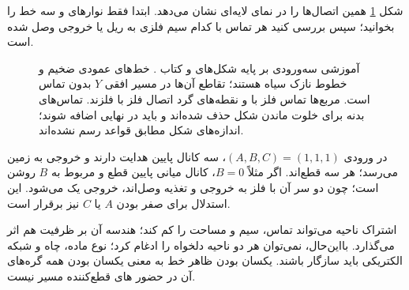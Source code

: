 شکل \ref{fig:layout-nand-stick} همین اتصال‌ها را در نمای لایه‌ای نشان می‌دهد.
ابتدا فقط نوارهای  و سه خط  را بخوانید؛
سپس بررسی کنید هر تماس با کدام سیم فلزی به ریل یا خروجی وصل شده است.
\begin{figure}[ht]
\centering
\begin{latin}
\end{latin}
\caption{ آموزشی  سه‌ورودی بر پایه شکل‌های
 و  کتاب \cite{weste}.
خط‌های عمودی ضخیم  و خطوط نازک سیاه  هستند؛
تقاطع آن‌ها در مسیر افقی \(Y\) بدون تماس است.
مربع‌ها تماس فلز با  و نقطه‌های گرد اتصال فلز با فلزند.
تماس‌های بدنه برای خلوت ماندن شکل حذف شده‌اند و باید در  نهایی اضافه شوند؛
اندازه‌های شکل مطابق قواعد رسم نشده‌اند.}
\label{fig:layout-nand-stick}
\end{figure}

در ورودی \((A,B,C)=(1,1,1)\)، سه کانال پایین هدایت دارند و خروجی به زمین می‌رسد؛
هر سه  قطع‌اند. اگر مثلاً \(B=0\)، کانال میانی پایین قطع و
 مربوط به \(B\) روشن است؛ چون دو سر آن با فلز به خروجی و تغذیه
وصل‌اند، خروجی یک می‌شود. این استدلال برای صفر بودن \(A\) یا \(C\) نیز برقرار است.

اشتراک ناحیه می‌تواند تماس، سیم و مساحت را کم کند؛ هندسه آن بر ظرفیت
 هم اثر می‌گذارد. بااین‌حال، نمی‌توان هر دو ناحیه دلخواه را
ادغام کرد؛ نوع ماده، چاه و شبکه الکتریکی باید سازگار باشند.
یکسان بودن ظاهر خط  به معنی یکسان بودن همه گره‌های آن در حضور
های قطع‌کننده مسیر نیست.

